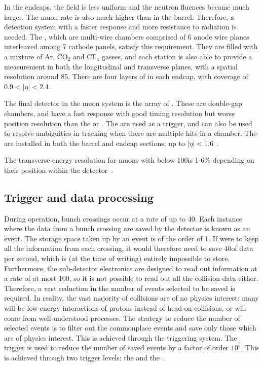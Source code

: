 In the endcaps, the field is less uniform and the neutron fluences become much larger. The muon rate is also much higher than in the barrel. Therefore, a detection system with a faster response and more resistance to radiation is needed. The \CSCs, which are multi-wire chambers comprised of 6 anode wire planes interleaved among 7 cathode panels, satisfy this requirement. They are filled with a mixture of Ar, CO$_{2}$ and CF$_{4}$ gasses, and each station is also able to provide a measurement in both the longitudinal and transverse planes, with a spatial resolution around 85\um. There are four layers of \CSCs in each endcap, with coverage of $0.9<|\eta|<2.4$.

The final detector in the muon system is the array of \RPCs. These are double-gap chambers, and have a fast response with good timing resolution but worse position resolution than the \DTs or \CSCs. The \RPCs are used as a trigger, and can also be used to resolve ambiguities in tracking when there are multiple hits in a chamber. The \RPCs are installed in both the barrel and endcap sections, up to $|\eta|<1.6$~\cite{CMSatLHC,cmsMuon}. 

The transverse energy resolution for muons with \pT below 100\GeV is 1-6\% depending on their position within the detector~\cite{MuonReco}.

\subsection{Trigger and data processing}
\label{sec:cms:trigger}

During operation, bunch crossings occur at a rate of up to 40\MHz. Each instance where the data from a bunch crossing are saved by the detector is known as an event. The storage space taken up by an event is of the order of 1\MB. If \CMS were to keep all the information from each crossing, it would therefore need to save 40\TB of data per second, which is (at the time of writing) entirely impossible to store. Furthermore, the \CMS sub-detector electronics are designed to read out information at a rate of at most 100\kHz, so it is not possible to read out all the collision data either. Therefore, a vast reduction in the number of events selected to be saved is required. In reality, the vast majority of collisions are of no physics interest: many will be low-energy interactions of protons instead of head-on collisions, or will come from well-understood \SM processes. The strategy to reduce the number of selected events is to filter out the commonplace events and save only those which are of physics interest. This is achieved through the \CMS triggering system. The trigger is used to reduce the number of saved events by a factor of order $10^5$. This is achieved through two trigger levels: the \LI and the \HLT.

